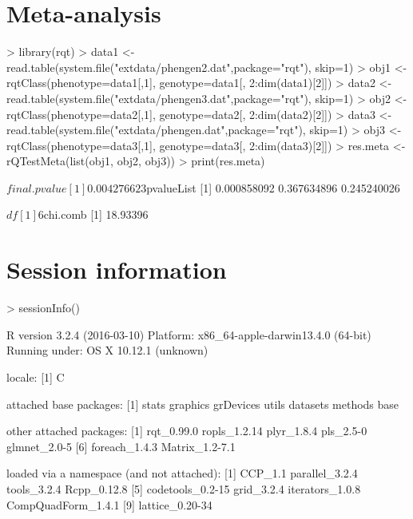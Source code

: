 \documentclass{article}
\begin{document}
\section{Meta-analysis}

\begin{Schunk}
\begin{Sinput}
> library(rqt)
> data1 <- read.table(system.file("extdata/phengen2.dat",package="rqt"), skip=1)
> obj1 <- rqtClass(phenotype=data1[,1], genotype=data1[, 2:dim(data1)[2]])
> data2 <- read.table(system.file("extdata/phengen3.dat",package="rqt"), skip=1)
> obj2 <- rqtClass(phenotype=data2[,1], genotype=data2[, 2:dim(data2)[2]])
> data3 <- read.table(system.file("extdata/phengen.dat",package="rqt"), skip=1)
> obj3 <- rqtClass(phenotype=data3[,1], genotype=data3[, 2:dim(data3)[2]])
> res.meta <- rQTestMeta(list(obj1, obj2, obj3))
> print(res.meta)
\end{Sinput}
\begin{Soutput}
$final.pvalue
[1] 0.004276623

$pvalueList
[1] 0.000858092 0.367634896 0.245240026

$df
[1] 6

$chi.comb
[1] 18.93396
\end{Soutput}
\end{Schunk}


\section{Session information}
\begin{Schunk}
\begin{Sinput}
> sessionInfo()
\end{Sinput}
\begin{Soutput}
R version 3.2.4 (2016-03-10)
Platform: x86_64-apple-darwin13.4.0 (64-bit)
Running under: OS X 10.12.1 (unknown)

locale:
[1] C

attached base packages:
[1] stats     graphics  grDevices utils     datasets  methods   base     

other attached packages:
[1] rqt_0.99.0     ropls_1.2.14   plyr_1.8.4     pls_2.5-0      glmnet_2.0-5  
[6] foreach_1.4.3  Matrix_1.2-7.1

loaded via a namespace (and not attached):
[1] CCP_1.1            parallel_3.2.4     tools_3.2.4        Rcpp_0.12.8       
[5] codetools_0.2-15   grid_3.2.4         iterators_1.0.8    CompQuadForm_1.4.1
[9] lattice_0.20-34   
\end{Soutput}
\end{Schunk}
\clearpage
\end{document}
